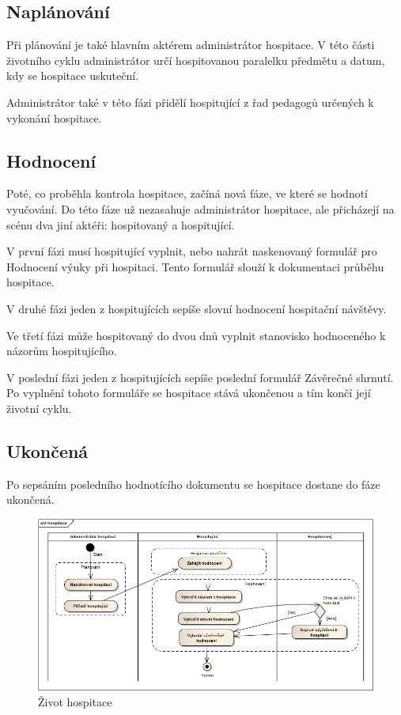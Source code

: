 \subsection{Naplánování}
Při plánování je také hlavním aktérem administrátor hospitace. V této části životního cyklu administrátor určí hospitovanou paralelku předmětu a datum,  kdy se hospitace uskuteční.  

Administrátor také v této fázi přidělí hospitující z řad pedagogů určených k vykonání hospitace.  
 
\subsection{Hodnocení}
Poté, co proběhla kontrola hospitace, začíná nová fáze, ve které se hodnotí vyučování. Do této fáze už nezasahuje administrátor hospitace, ale přicházejí na scénu dva jiní aktéři: hospitovaný a hospitující.

V první fázi musí hospitující vyplnit, nebo nahrát naskenovaný formulář pro Hodnocení výuky při hospitaci. Tento formulář slouží k dokumentaci průběhu hospitace.

V druhé fázi jeden z hospitujících sepíše slovní hodnocení hospitační návštěvy.

Ve třetí fázi může hospitovaný do dvou dnů vyplnit stanovisko hodnoceného k názorům hospitujícího.  

V poslední fázi jeden z hospitujících sepíše poslední formulář Závěrečné shrnutí. Po vyplnění tohoto formuláře se hospitace stává ukončenou a tím končí její životní cyklu.
 
\subsection{Ukončená}
Po sepsáním posledního hodnotícího dokumentu se hospitace dostane do fáze ukončená. 

\begin{figure}[h]
\begin{center}
\includegraphics[width=14cm]{figures/hospitace}
\caption{Život hospitace}
\label{fig:hospitace}
\end{center}
\end{figure}
